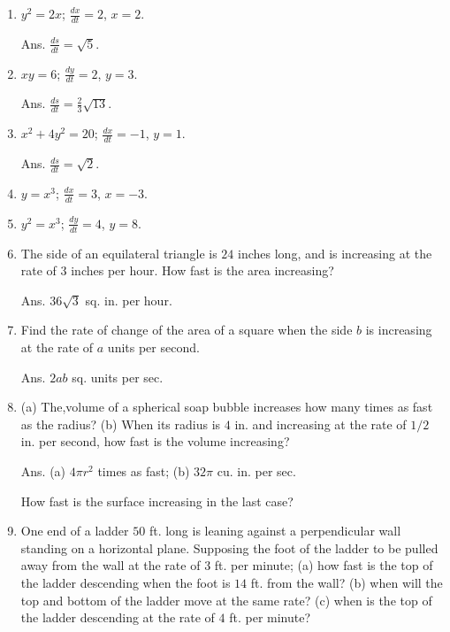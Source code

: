 \begin{enumerate}
\addtocounter{enumi}{11}

\item
$y^2 = 2x$; $\frac{dx}{dt} = 2$, $x = 2$. 	

Ans. 	
$\frac{ds}{dt} = \sqrt{5}$.

\item
$xy = 6$; $\frac{dy}{dt} = 2$, $y = 3$. 

Ans. $\frac{ds}{dt} = \frac{2}{3} \sqrt{13}$.

\item
$x^2 + 4 y^2 = 20$; $\frac{dx}{dt} = - 1$, $y = 1$.

Ans. $ 	\frac{ds}{dt} = \sqrt{2}$.

\item
$y = x^3$; $\frac{dx}{dt} = 3$, $x = - 3$.

\item
$y^2 = x^3$; $\frac{dy}{dt} = 4$, $y = 8$.

\item
The side of an equilateral triangle is $24$ inches long, and is 
increasing at the rate of $3$ inches per hour. 
How fast is the area increasing? 

Ans. $36\sqrt{3}$ sq. in. per hour.

\item
Find the rate of change of the area of a square when the side 
$b$ is increasing at the rate of $a$ units per second. 

Ans. $2 ab$ sq. units per sec.

\item
(a) The,volume of a spherical soap bubble increases how 
many times as fast as the radius? 
(b) When its radius is $4$ in. and increasing at the rate of 
$1/2$ in. per second, how fast is the volume increasing? 

Ans. (a) $4\pi r^2$ times as fast; (b) $32\pi$ cu. in. per sec.

How fast is the surface increasing in the last case?

\item
One end of a ladder $50$ ft. long is leaning against a 
perpendicular wall standing on a horizontal plane. Supposing 
the foot of the ladder to be pulled away from the wall at 
the rate of $3$ ft. per minute; 
(a) how fast is the top of the ladder descending when 
the foot is $14$ ft. from the wall? 
(b) when will the top and bottom of the ladder move at the same rate? 
(c) when is the top of the ladder descending at the 
rate of $4$ ft. per minute? 


\end{enumerate}
